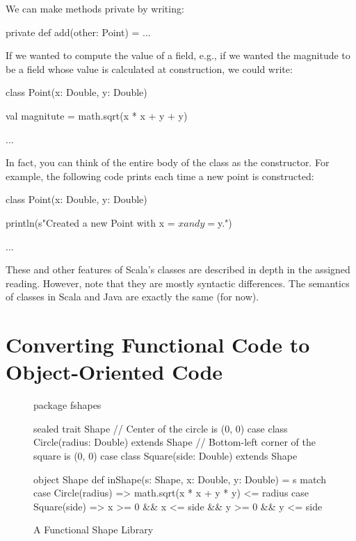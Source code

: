 \documentclass{book}
\begin{document}
We can make methods private by writing:
\begin{scalacode}
private def add(other: Point) = { ... }
\end{scalacode}

If we wanted to compute the value of a field, e.g., if we wanted the magnitude
to be a field whose value is calculated at construction, we could write:
%
\begin{scalacode}
class Point(x: Double, y: Double) {

  val magnitute = math.sqrt(x * x + y + y)

  ...
}
\end{scalacode}

In fact, you can think of the entire body of the class as the constructor.
For example, the following code prints each time a new point is constructed:

%
\begin{scalacode}
class Point(x: Double, y: Double) {

  println(s"Created a new Point with x = $x and y = $y.")

  ...
}
\end{scalacode}

These and other features of Scala's classes are described in depth in the
assigned reading. However, note that they are mostly syntactic differences.
The semantics of classes in Scala and Java are exactly the same (for now).

\section{Converting Functional Code to Object-Oriented Code}

\begin{figure}
\begin{scalacode}
package fshapes

sealed trait Shape
// Center of the circle is (0, 0)
case class Circle(radius: Double) extends Shape
// Bottom-left corner of the square is (0, 0)
case class Square(side: Double) extends Shape

object Shape {
  def inShape(s: Shape, x: Double, y: Double) = s match {
    case Circle(radius) => {
      math.sqrt(x * x + y * y) <= radius
    }
    case Square(side) => {
      x >= 0 && x <= side && y >= 0 && y <= side
    }
  }
}
\end{scalacode}
\caption{A Functional Shape Library}
\label{fshapes1}
\end{figure}
\end{document}
